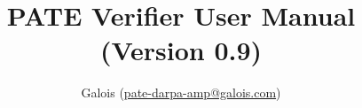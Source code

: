 \documentclass[11pt]{article}
\title{PATE Verifier User Manual (Version 0.9)}
\author{Galois (\href{mailto:pate-darpa-amp@galois.com}{pate-darpa-amp@galois.com})}
\begin{document}
{\let\newpage\relax\maketitle}


\newpage
\tableofcontents
\newpage

\acresetall





\clearpage

\end{document}

